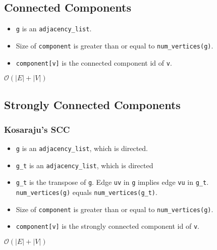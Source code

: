 \subsection{Connected Components}
{\small
     
}
\begin{itemdescr}
      \pnum\preconditions
      \begin{itemize}
            \item
                  \lstinline{g} is an \lstinline{adjacency_list}.
            \item
                  Size of \lstinline{component} is greater than or equal to \lstinline{num_vertices(g)}.
      \end{itemize}
      \pnum\effects
      \begin{itemize}
            \item
                  \lstinline{component[v]} is the connected component id of \lstinline{v}.
      \end{itemize}

      \pnum\complexity $\mathcal{O}(|E|+|V|)$
\end{itemdescr}

\subsection{Strongly Connected Components}
\subsubsection{Kosaraju's SCC}
{\small
      
}
\begin{itemdescr}
      \pnum\preconditions
      \begin{itemize}
            \item
                  \lstinline{g} is an \lstinline{adjacency_list}, which is directed.
            \item
                  \lstinline{g_t} is an \lstinline{adjacency_list}, which is directed
            \item
                  \lstinline{g_t} is the transpose of \lstinline{g}. Edge \lstinline{uv} in \lstinline{g} implies edge \lstinline{vu} in \lstinline{g_t}. \lstinline{num_vertices(g)} equals \lstinline{num_vertices(g_t)}.
            \item
                  Size of \lstinline{component} is greater than or equal to \lstinline{num_vertices(g)}.
      \end{itemize}
      \pnum\effects
      \begin{itemize}
            \item
                  \lstinline{component[v]} is the strongly connected component id of \lstinline{v}.
      \end{itemize}

      \pnum\complexity $\mathcal{O}(|E|+|V|)$
\end{itemdescr}

